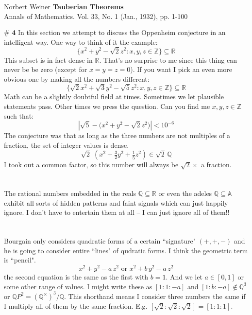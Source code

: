 \documentclass[12pt]{article}
\begin{document}
\begin{thebibliography}{}

\item Norbert Weiner  \textbf{Tauberian Theorems} \\ Annals of Mathematics. Vol. 33, No. 1 (Jan., 1932), pp. 1-100


\end{thebibliography}

\newpage

\noindent \#\textbf{ 4} In this section we attempt to discuss the Oppenheim conjecture in an intelligent way.  One way to think of it the example:
$$ \big\{ x^2 + y^2 - \sqrt{2} z^2 : x, y, z \in \mathbb{Z} \big\} \subseteq \mathbb{R} $$
This subset is in fact dense in $\mathbb{R}$.  That's no surprise to me since this thing can never be be zero (except for $x=y=z=0$).  If you want I pick an even more obvious one by making all the numbers different:
$$ \big\{ \sqrt{2} x^2 + \sqrt{3}y^2 - \sqrt{5} z^2 : x, y, z \in \mathbb{Z} \big\} \subseteq \mathbb{R} $$
Math can be a slightly doubtful field at times.  Sometimes we let plausible statements pass.  Other times we press the question.  Can you find me $x,y,z \in \mathbb{Z}$ such that:
$$ |\sqrt{5} -  \big( x^2 + y^2 - \sqrt{2} z^2 \big) | < 10^{-6} $$
The conjecture was that as long as the three numbers are not multiples of a fraction, the set of integer values is dense. 
$$ \sqrt{2} \;(x^2 + \tfrac{3}{2} y^2 + \tfrac{1}{5}z^2) \in \sqrt{2}\, \mathbb{Q}$$ 
I took out a common factor, so this number will always be $\sqrt{2}\times$ a fraction. \\ \\ \\
The rational numbers embedded in the reals $\mathbb{Q} \subseteq \mathbb{R}$ or even the adeles $\mathbb{Q} \subseteq \mathbb{A}$ exhibit all sorts of hidden patterns and faint signals which can just happily ignore. I don't have to entertain them at all -- I can just ignore all of them!! \\ \\ \\
Bourgain only considers quadratic forms of a certain ``signature" $(+,+,-)$ and he is going to consider entire ``lines" of qudratic forms.  I think the geometric term is ``pencil". 
$$ x^2 + y^2 - a\,  z^2  \text{ or }x^2 + b\, y^2 - a\,  z^2$$
the second equation is the same as the first with $b=1$. And we let $a \in [0,1]$ or some other range of values.  I might write these as $[1:1:-a]$ and $[1:b:-a] \notin \mathbb{Q}^3$ or $\mathbb{Q}P^2 = (\mathbb{Q}^\times)^3/\mathbb{Q}$.  This shorthand means I consider three numbers the same if I multiply all of them by the same fraction.  E.g. $[\sqrt{2}:\sqrt{2}:\sqrt{2} ]=[1:1:1] $.\\ \\
\end{document}

